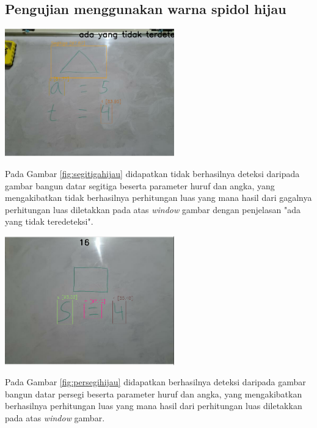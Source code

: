 \subsection{Pengujian menggunakan warna spidol hijau}
\begin{center}
	\includegraphics[width=0.55\textwidth]{gambar/segitiga hijau.png}
	\label{fig:segitigahijau}
\end{center}
Pada Gambar \ref{fig:segitigahijau} didapatkan tidak berhasilnya deteksi daripada gambar bangun datar segitiga beserta parameter huruf dan angka, yang mengakibatkan tidak berhasilnya perhitungan luas yang mana hasil dari gagalnya perhitungan luas diletakkan pada atas \textit{window} gambar dengan penjelasan "ada yang tidak teredeteksi".

\begin{center}
	\includegraphics[width=0.55\textwidth]{gambar/persegi hijau.png}
	\label{fig:persegihijau}
\end{center}
Pada Gambar \ref{fig:persegihijau} didapatkan berhasilnya deteksi daripada gambar bangun datar persegi beserta parameter huruf dan angka, yang mengakibatkan berhasilnya perhitungan luas yang mana hasil dari perhitungan luas diletakkan pada atas \textit{window} gambar.

